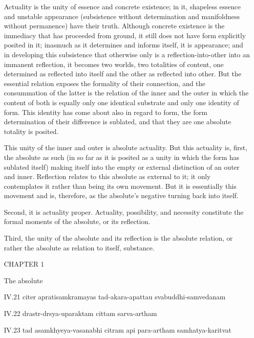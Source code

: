 Actuality is the unity of essence and concrete existence;
in it, shapeless essence and unstable appearance
(subsistence without determination
and manifoldness without permanence)
have their truth.
Although concrete existence is the immediacy
that has proceeded from ground,
it still does not have form explicitly posited in it;
inasmuch as it determines and informs itself, it is appearance;
and in developing this subsistence that otherwise only is
a reflection-into-other into an immanent reflection,
it becomes two worlds, two totalities of content,
one determined as reflected into itself
and the other as reflected into other.
But the essential relation exposes
the formality of their connection,
and the consummation of the latter is
the relation of the inner and the outer
in which the content of both is equally
only one identical substrate
and only one identity of form.
This identity has come about also in regard to form,
the form determination of their difference is sublated,
and that they are one absolute totality is posited.

This unity of the inner and outer is absolute actuality.
But this actuality is, first, the absolute as such
(in so far as it is posited as a unity
in which the form has sublated itself)
making itself into the empty or external distinction
of an outer and inner.
Reflection relates to this absolute as external to it;
it only contemplates it rather than being its own movement.
But it is essentially this movement
and is, therefore, as the absolute's
negative turning back into itself.

Second, it is actuality proper.
Actuality, possibility, and necessity constitute
the formal moments of the absolute, or its reflection.

Third, the unity of the absolute and its reflection is
the absolute relation, or rather the absolute as
relation to itself, substance.

CHAPTER 1

The absolute

IV.21
citer apratisamkramayas tad-akara-apattau svabuddhi-samvedanam

IV.22
drastr-drsya-uparaktam cittam sarva-artham

IV.23
tad asamkhyeya-vasanabhi citram api para-artham samhatya-karitvat

